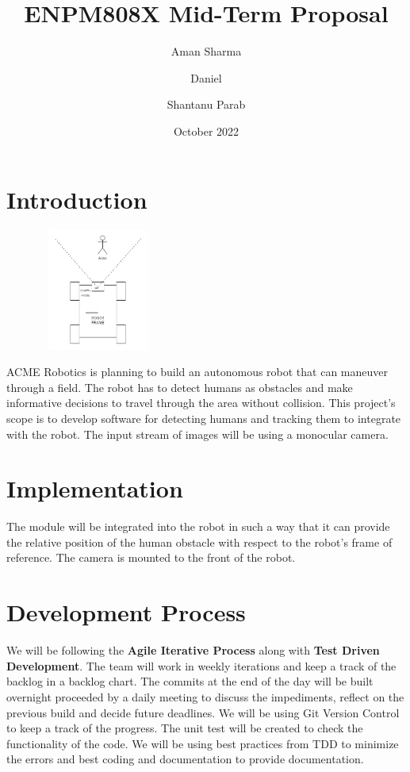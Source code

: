 \documentclass[11pt,a4paper]{article}
\title{ENPM808X Mid-Term Proposal}
\author[*]{Aman Sharma}
\author[*]{Daniel}
\author[*]{Shantanu Parab}
\affil[*]{Professional Master's in Robotics, University of Maryland}
\date{October 2022}
\begin{document}
\maketitle
\section*{Introduction}
\begin{figure}
    \centering
    \includegraphics[width=4cm, height=4cm]{images/REPORT DIAGRAM.png}
\end{figure}
ACME Robotics is planning to build an autonomous robot that can maneuver through a field. The robot has to detect humans as obstacles and make informative decisions to travel through the area without collision. 
This project's scope is to develop software for detecting humans and tracking them to integrate with the robot. The input stream of images will be using a monocular camera. 

\section*{Implementation}
The module will be integrated into the robot in such a way that it can provide the relative position of the human obstacle with respect to the robot's frame of reference. The camera is mounted to the front of the robot.
\section*{Development Process}
We will be following the \textbf{Agile Iterative Process} along with \textbf{Test Driven Development}. The team will work in weekly iterations and keep a  track of the backlog in a backlog chart. The commits at the end of the day will be built overnight proceeded by a daily meeting to discuss the impediments, reflect on the previous build and decide future deadlines. We will be using Git Version Control to keep a track of the progress. The unit test will be created to check the functionality of the code. We will be using best practices from TDD to minimize the errors and best coding and documentation to provide documentation.
\end{document}
